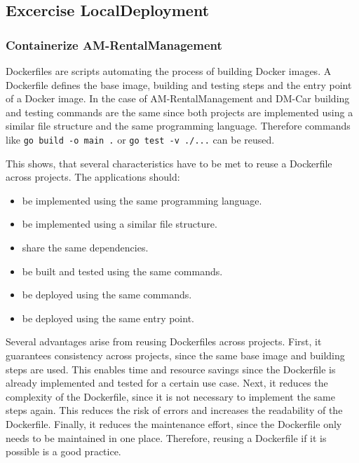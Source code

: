 \subsection{Excercise LocalDeployment}
\subsubsection*{Containerize AM-RentalManagement}
Dockerfiles are scripts automating the process of building Docker images.
A Dockerfile defines the base image, building and testing steps and the entry point of a Docker image.
In the case of AM-RentalManagement and DM-Car building and testing commands are the same since both projects are implemented using a similar file structure and the same programming language.
Therefore commands like \texttt{go build -o main .} or \texttt{go test -v ./...} can be reused.

This shows, that several characteristics have to be met to reuse a Dockerfile across projects.
The applications should:
\begin{itemize}
    \item be implemented using the same programming language.
    \item be implemented using a similar file structure.
    \item share the same dependencies.
    \item be built and tested using the same commands.
    \item be deployed using the same commands.
    \item be deployed using the same entry point.
\end{itemize}

Several advantages arise from reusing Dockerfiles across projects.
First, it guarantees consistency across projects, since the same base image and building steps are used.
This enables time and resource savings since the Dockerfile is already implemented and tested for a certain use case.
Next, it reduces the complexity of the Dockerfile, since it is not necessary to implement the same steps again.
This reduces the risk of errors and increases the readability of the Dockerfile.
Finally, it reduces the maintenance effort, since the Dockerfile only needs to be maintained in one place.
Therefore, reusing a Dockerfile if it is possible is a good practice.

